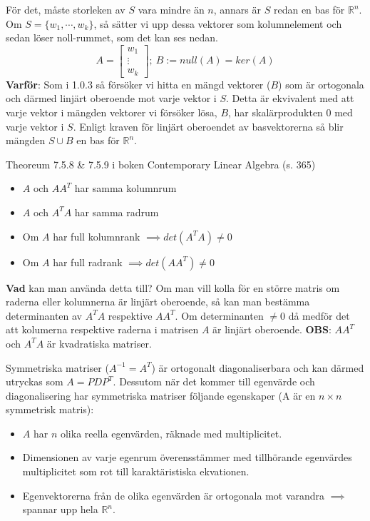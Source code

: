 \documentclass{report}
\begin{document}
{
För det, måste storleken av $ S $ vara mindre än $ n $, annars är $ S $ redan en bas för $ \mathbb{R}^n $. Om $ S = \{ w_1, \cdots, w_k\} $, så sätter vi upp dessa vektorer som kolumnelement och sedan löser noll-rummet, som det kan ses nedan.
\[
A =
\begin{bmatrix}
	w_1 \\
	\vdots \\
	w_k
\end{bmatrix}; \: B := null(A) = ker(A)
\]
\textbf{Varför}: Som i 1.0.3 så försöker vi hitta en mängd vektorer ($ B $) som är ortogonala och därmed linjärt oberoende mot varje vektor i $ S $. Detta är ekvivalent med att varje vektor i mängden vektorer vi försöker lösa, $ B $, har skalärprodukten 0 med varje vektor i $ S $. Enligt kraven för linjärt oberoendet av basvektorerna så blir mängden $ S \cup B $ en bas för $ \mathbb{R}^n $.  
}

{
Theoreum 7.5.8 \& 7.5.9 i boken Contemporary Linear Algebra (s. 365)
\begin{itemize}
	\item $A$ och $A A^T$ har samma kolumnrum
	\item $A$ och $A^T A$ har samma radrum
	\item Om $A$ har full kolumnrank $ \implies det(A^T A) \ne 0 $
	\item Om $A$ har full radrank $ \implies det(A A^T) \ne 0 $
\end{itemize}
\textbf{Vad} kan man använda detta till? Om man vill kolla för en större matris om raderna eller kolumnerna är linjärt oberoende, så kan man bestämma determinanten av $A^T A$ respektive $A A^T$. Om determinanten $ \ne 0$ då medför det att kolumerna respektive raderna i matrisen $A$ är linjärt oberoende. \textbf{OBS}: $A A^T$ och $A^T A$ är kvadratiska matriser.  
}

{
Symmetriska matriser ($ A^{-1} = A^T $) är ortogonalt diagonaliserbara och kan därmed utryckas som $ A = P D P^T $. Dessutom när det kommer till egenvärde och diagonalisering har symmetriska matriser följande egenskaper (A är en $n \times n$ symmetrisk matris):
\begin{itemize}
	\item $ A $ har $ n $ olika reella egenvärden, räknade med multiplicitet.
	\item Dimensionen av varje egenrum överensstämmer med tillhörande egenvärdes multiplicitet som rot till karaktäristiska ekvationen.
	\item Egenvektorerna från de olika egenvärden är ortogonala mot varandra $ \implies $ spannar upp hela $ \mathbb{R}^n $.
\end{itemize}
}
\end{document}
